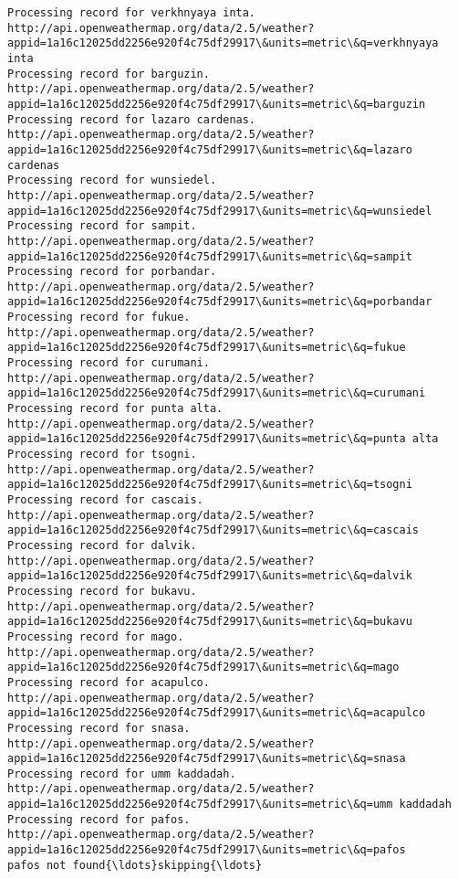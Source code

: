 \documentclass[11pt]{article}
\begin{document}
\begin{Verbatim}[commandchars=\\\{\}]
Processing record for verkhnyaya inta.
http://api.openweathermap.org/data/2.5/weather?appid=1a16c12025dd2256e920f4c75df29917\&units=metric\&q=verkhnyaya inta
Processing record for barguzin.
http://api.openweathermap.org/data/2.5/weather?appid=1a16c12025dd2256e920f4c75df29917\&units=metric\&q=barguzin
Processing record for lazaro cardenas.
http://api.openweathermap.org/data/2.5/weather?appid=1a16c12025dd2256e920f4c75df29917\&units=metric\&q=lazaro cardenas
Processing record for wunsiedel.
http://api.openweathermap.org/data/2.5/weather?appid=1a16c12025dd2256e920f4c75df29917\&units=metric\&q=wunsiedel
Processing record for sampit.
http://api.openweathermap.org/data/2.5/weather?appid=1a16c12025dd2256e920f4c75df29917\&units=metric\&q=sampit
Processing record for porbandar.
http://api.openweathermap.org/data/2.5/weather?appid=1a16c12025dd2256e920f4c75df29917\&units=metric\&q=porbandar
Processing record for fukue.
http://api.openweathermap.org/data/2.5/weather?appid=1a16c12025dd2256e920f4c75df29917\&units=metric\&q=fukue
Processing record for curumani.
http://api.openweathermap.org/data/2.5/weather?appid=1a16c12025dd2256e920f4c75df29917\&units=metric\&q=curumani
Processing record for punta alta.
http://api.openweathermap.org/data/2.5/weather?appid=1a16c12025dd2256e920f4c75df29917\&units=metric\&q=punta alta
Processing record for tsogni.
http://api.openweathermap.org/data/2.5/weather?appid=1a16c12025dd2256e920f4c75df29917\&units=metric\&q=tsogni
Processing record for cascais.
http://api.openweathermap.org/data/2.5/weather?appid=1a16c12025dd2256e920f4c75df29917\&units=metric\&q=cascais
Processing record for dalvik.
http://api.openweathermap.org/data/2.5/weather?appid=1a16c12025dd2256e920f4c75df29917\&units=metric\&q=dalvik
Processing record for bukavu.
http://api.openweathermap.org/data/2.5/weather?appid=1a16c12025dd2256e920f4c75df29917\&units=metric\&q=bukavu
Processing record for mago.
http://api.openweathermap.org/data/2.5/weather?appid=1a16c12025dd2256e920f4c75df29917\&units=metric\&q=mago
Processing record for acapulco.
http://api.openweathermap.org/data/2.5/weather?appid=1a16c12025dd2256e920f4c75df29917\&units=metric\&q=acapulco
Processing record for snasa.
http://api.openweathermap.org/data/2.5/weather?appid=1a16c12025dd2256e920f4c75df29917\&units=metric\&q=snasa
Processing record for umm kaddadah.
http://api.openweathermap.org/data/2.5/weather?appid=1a16c12025dd2256e920f4c75df29917\&units=metric\&q=umm kaddadah
Processing record for pafos.
http://api.openweathermap.org/data/2.5/weather?appid=1a16c12025dd2256e920f4c75df29917\&units=metric\&q=pafos
pafos not found{\ldots}skipping{\ldots}

\end{Verbatim}
\end{document}
